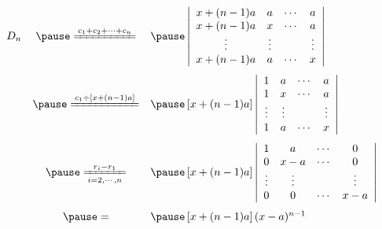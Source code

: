     
\begin{frame}
  
  \begin{center}
  \end{center}
  $$
  \begin{array}{rcl}
    D_n  
    & \pause \xlongequal{c_1+c_2+\cd +c_n}& \pause 
    \left|
    \begin{array}{cccc}
      x+(n-1)a & a     & \cd & a \\
      x+(n-1)a & x     & \cd & a \\
      \vd &      \vd &  & \vd \\
      x+(n-1)a & a     & \cd & x 
    \end{array}
    \right|  \\[1.0cm] 
    & \pause \xlongequal{c_1\div [x+(n-1)a] } & \pause 
             \left[x+(n-1)a\right]\left|
             \begin{array}{cccc}
               1 & a     & \cd & a \\
               1 & x     & \cd & a \\
               \vd   & \vd &  & \vd \\
              1 & a     & \cd & x 
            \end{array}
            \right|  \\[1.0cm]
            & \pause \xlongequal[i = 2, \cd, n]{r_i - r_1} & \pause
            \left[x+(n-1)a\right]\left|
            \begin{array}{cccc}
              1 & a   & \cd & 0 \\
              0 & x-a & \cd & 0 \\
              \vd  & \vd &  & \vd \\
              0 & 0   & \cd & x-a 
            \end{array}
            \right| \\[1.0cm]
            & \pause= & \pause \left[x+(n-1)a\right](x-a)^{n-1}
  \end{array}
  $$
\end{frame}
    
    

